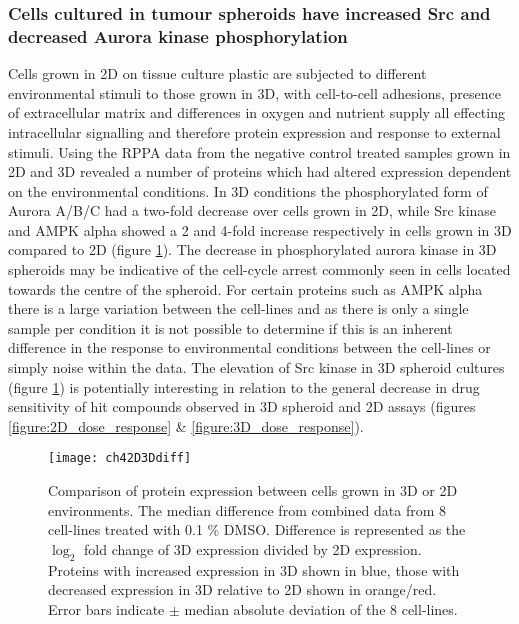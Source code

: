 \documentclass[a4paper,11pt,twoside,openright]{scrbook}
\begin{document}
\subsubsection{Cells cultured in tumour spheroids have increased Src and decreased Aurora kinase phosphorylation}
Cells grown in 2D on tissue culture plastic are subjected to different environmental stimuli to those grown in 3D, with 
cell-to-cell adhesions, presence of extracellular matrix and differences in oxygen and nutrient supply all effecting 
intracellular signalling and therefore protein expression and response to external stimuli.
Using the RPPA data from the negative control treated samples grown in 2D and 3D revealed a number of proteins which 
had altered expression dependent on the environmental conditions.
In 3D conditions the phosphorylated form of Aurora A/B/C had a two-fold decrease over cells grown in 2D, while Src 
kinase and AMPK alpha showed a 2 and 4-fold increase respectively in cells grown in 3D compared to 2D (figure 
\ref{figure:rppa_2D_3D_diff}).
The decrease in phosphorylated aurora kinase in 3D spheroids may be indicative of the cell-cycle arrest commonly seen 
in cells located towards the centre of the spheroid. \cite{Laurent2013a}
For certain proteins such as AMPK alpha there is a large variation between the cell-lines and as there is only a single 
sample per condition it is not possible to determine if this is an inherent difference in the response to environmental 
conditions between the cell-lines or simply noise within the data.
The elevation of Src kinase in 3D spheroid cultures (figure \ref{figure:rppa_2D_3D_diff}) is potentially interesting in 
relation to the general decrease in drug sensitivity of hit compounds observed in 3D spheroid and 2D assays (figures 
\ref{figure:2D_dose_response} \& \ref{figure:3D_dose_response}).


\begin{figure}
    \captionsetup{width=0.8\textwidth}
    \caption[Difference in protein expression in cells grown in 3D compared to 2D]{
        Comparison of protein expression between cells grown in 3D or 2D environments.
        The median difference from combined data from 8 cell-lines treated with 0.1 \% DMSO.
        Difference is represented as the $\log_{2}$ fold change of 3D expression divided by 2D expression.
        Proteins with increased expression in 3D shown in blue, those with decreased expression in 3D relative to 2D 
shown in orange/red.
        Error bars indicate $\pm$ median absolute deviation of the 8 cell-lines.
    }
    \texttt{[image: ch42D3Ddiff]}
    \label{figure:rppa_2D_3D_diff}
\end{figure}
\end{document}
